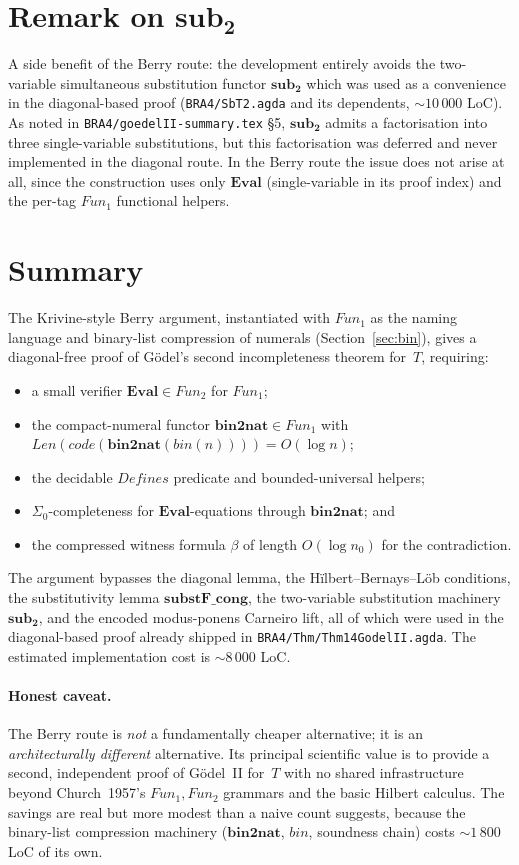 \documentclass[11pt]{article}
\theoremstyle{plain}
\theoremstyle{definition}
\theoremstyle{remark}
\newcommand{\code}[1]{\mathit{code}(#1)}
\newcommand{\Fun}{\mathit{Fun}}
\newcommand{\Defines}{\mathit{Defines}}
\newcommand{\Len}{\mathit{Len}}
\newcommand{\Eval}{\mathbf{Eval}}
\newcommand{\bnt}{\mathbf{bin2nat}}
\newcommand{\bin}{\mathit{bin}}
\begin{document}
\section{Remark on $\mathbf{sub_2}$}

A side benefit of the Berry route: the development entirely avoids the
two-variable simultaneous substitution functor $\mathbf{sub_2}$ which
was used as a convenience in the diagonal-based proof
(\verb|BRA4/SbT2.agda| and its dependents, $\sim 10\,000$ LoC).  As
noted in \verb|BRA4/goedelII-summary.tex| {\S}5, $\mathbf{sub_2}$
admits a factorisation into three single-variable substitutions, but
this factorisation was deferred and never implemented in the diagonal
route.  In the Berry route the issue does not arise at all, since the
construction uses only $\Eval$ (single-variable in its proof index)
and the per-tag $\Fun_1$ functional helpers.

\section{Summary}

The Krivine-style Berry argument, instantiated with $\Fun_1$ as the
naming language and binary-list compression of numerals
(Section~\ref{sec:bin}), gives a diagonal-free proof of G\"odel's
second incompleteness theorem for~$T$, requiring:
\begin{itemize}
\item a small verifier $\Eval \in \Fun_2$ for $\Fun_1$;
\item the compact-numeral functor $\bnt \in \Fun_1$ with
$\Len(\code{\bnt(\bin(n))}) = O(\log n)$;
\item the decidable $\Defines$ predicate and bounded-universal helpers;
\item $\Sigma_0$-completeness for $\Eval$-equations through
$\bnt$; and
\item the compressed witness formula $\beta$ of length
$O(\log n_0)$ for the contradiction.
\end{itemize}
The argument bypasses the diagonal lemma, the
H\"ilbert--Bernays--L\"ob conditions, the substitutivity lemma
$\mathbf{substF\_cong}$, the two-variable substitution machinery
$\mathbf{sub_2}$, and the encoded modus-ponens Carneiro lift, all of
which were used in the diagonal-based proof already shipped in
\verb|BRA4/Thm/Thm14GodelII.agda|.  The estimated implementation cost
is $\sim 8\,000$ LoC.

\paragraph{Honest caveat.}  The Berry route is \emph{not} a fundamentally
cheaper alternative; it is an \emph{architecturally different}
alternative.  Its principal scientific value is to provide a second,
independent proof of G\"odel~II for~$T$ with no shared infrastructure
beyond Church~1957's $\Fun_1, \Fun_2$ grammars and the basic Hilbert
calculus.  The savings are real but more modest than a naive count
suggests, because the binary-list compression machinery
($\bnt$, $\bin$, soundness chain) costs $\sim 1\,800$ LoC of its own.
\end{document}
